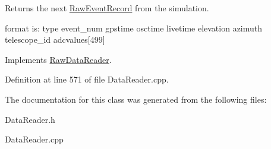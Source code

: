 Returns the next \hyperlink{structRawEventRecord}{RawEventRecord} from the simulation. 

format is: type event\_\-num gpstime osctime livetime elevation azimuth telescope\_\-id adcvalues\mbox{[}499\mbox{]} 

Implements \hyperlink{classRawDataReader}{RawDataReader}.



Definition at line 571 of file DataReader.cpp.



The documentation for this class was generated from the following files:\begin{DoxyCompactItemize}
\item 
DataReader.h\item 
DataReader.cpp\end{DoxyCompactItemize}
